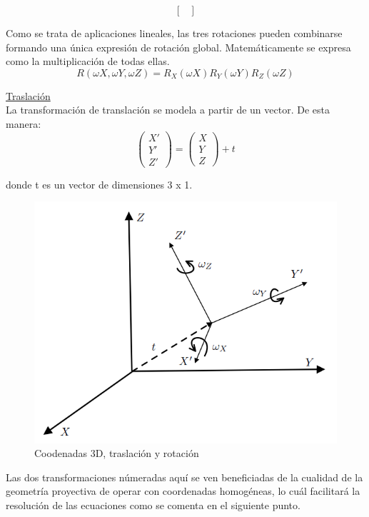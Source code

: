 \documentclass[a4,10pt]{article}
\begin{document}
\begin{enumerate}
\begin{equation}
\begin{bmatrix}
\end{bmatrix}
\end{equation}

Como se trata de aplicaciones lineales, las tres rotaciones pueden combinarse formando una única expresión de rotación global. Matemáticamente se expresa como la multiplicación de todas ellas.\\
\begin{equation}
R (\omega X , \omega Y , \omega Z ) = R_X (\omega X ) R_Y (\omega Y ) R_Z (\omega Z )
\end{equation}

\underline{Traslación}\\
La transformación de translación se modela a partir de un vector. De esta manera:\\
\begin{equation}
\begin{pmatrix}
X'\\
Y'\\
Z'
\end{pmatrix}
=
\begin{pmatrix}
X\\
Y\\
Z
\end{pmatrix}
+ t
\end{equation}

donde t es un vector de dimensiones 3 x 1.\\
\begin{figure}
\begin{center}
\includegraphics[width=0.5\linewidth]{images/figura1}
\end{center}
\caption{Coodenadas 3D, traslación y rotación}
\label{fig:figura1}
\end{figure}
Las dos transformaciones númeradas aquí se ven beneficiadas de la cualidad de la geometría proyectiva de operar con coordenadas homogéneas, lo cuál facilitará la resolución de las ecuaciones como se comenta en el siguiente punto.


\end{enumerate}
\end{document}
